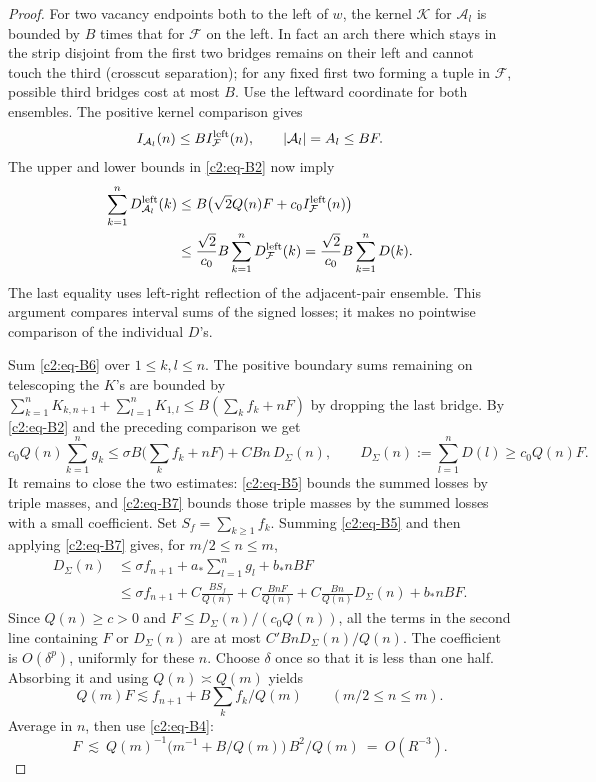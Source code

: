\begin{proof}
For two vacancy endpoints both to the left of \(w\), the kernel \(\mathscr K\) for \(\mathcal A_l\) is bounded by \(B\) times that for \(\mathcal F\) on the left. In fact an arch there which stays in the strip disjoint from the first two bridges remains on their left and cannot touch the third (crosscut separation); for any fixed first two forming a tuple in \(\mathcal F\), possible third bridges cost at most \(B\). Use the leftward coordinate for both ensembles. The positive
kernel comparison gives
\[
 I_{\mathcal A_l}(n)\le B I_{\mathcal F}^{\rm left}(n),
 \qquad |\mathcal A_l|=A_l\le BF.
\]
The upper and lower bounds in \eqref{c2:eq-B2} now imply
\[
\begin{aligned}
 \sum_{k=1}^n D^{\rm left}_{\mathcal A_l}(k)
 &\le B\big(\sqrt2 Q(n)F+c_0 I_{\mathcal F}^{\rm left}(n)\big)\\
 &\le \frac{\sqrt2}{c_0}B
       \sum_{k=1}^n D^{\rm left}_{\mathcal F}(k)
  =\frac{\sqrt2}{c_0}B\sum_{k=1}^nD(k).
\end{aligned}
\]
The last equality uses left-right reflection of the adjacent-pair ensemble.
This argument compares interval sums of the signed losses; it makes no
pointwise comparison of the individual \(D\)'s.

Sum \eqref{c2:eq-B6} over \(1\le k,l\le n\). The positive boundary sums remaining on telescoping the \(K\)'s are bounded by
\(\sum_{k=1}^n K_{k,n+1}+\sum_{l=1}^n K_{1,l}\le B(\sum_k f_k+nF)\) by dropping the last bridge. By \eqref{c2:eq-B2} and the preceding comparison we get
\begin{equation}
 c_0 Q(n)\sum_{k=1}^n g_k
 \le \sigma B\big(\sum_k f_k+nF\big)+C Bn\,D_\Sigma(n),
 \qquad D_\Sigma(n):=\sum_{l=1}^n D(l)\ge c_0 Q(n)F.                       \label{c2:eq-B7}
\end{equation}
It remains to close the two estimates: \eqref{c2:eq-B5} bounds the
summed losses by triple masses, and \eqref{c2:eq-B7} bounds those triple
masses by the summed losses with a small coefficient. Set
\(S_f=\sum_{k\ge1}f_k\). Summing \eqref{c2:eq-B5} and then applying
\eqref{c2:eq-B7} gives, for \(m/2\le n\le m\),
\[
\begin{aligned}
 D_\Sigma(n)
 &\le \sigma f_{n+1}+a_*\sum_{l=1}^n g_l+b_*nBF\\
 &\le \sigma f_{n+1}
   +C\frac{B S_f}{Q(n)}
   +C\frac{BnF}{Q(n)}+C\frac{Bn}{Q(n)}D_\Sigma(n)+b_*nBF.
\end{aligned}
\]
Since \(Q(n)\ge c>0\) and \(F\le D_\Sigma(n)/(c_0Q(n))\), all the
terms in the second line containing \(F\) or \(D_\Sigma(n)\) are at most
\(C'BnD_\Sigma(n)/Q(n)\). The coefficient is \(O(\delta^p)\), uniformly
for these \(n\). Choose \(\delta\) once so that it is less than one half.
Absorbing it and using \(Q(n)\asymp Q(m)\) yields
\[
 Q(m) F\lesssim f_{n+1}+B\sum_k f_k/Q(m)
 \qquad(m/2\le n\le m).
\]
Average in \(n\), then use \eqref{c2:eq-B4}:
\begin{equation}
 F\ \lesssim\ Q(m)^{-1}\big(m^{-1}+B/Q(m)\big)\, B^2/Q(m)
 \ =\ O(R^{-3}).                                                          \label{c2:eq-B8}
\end{equation}


\end{proof}
